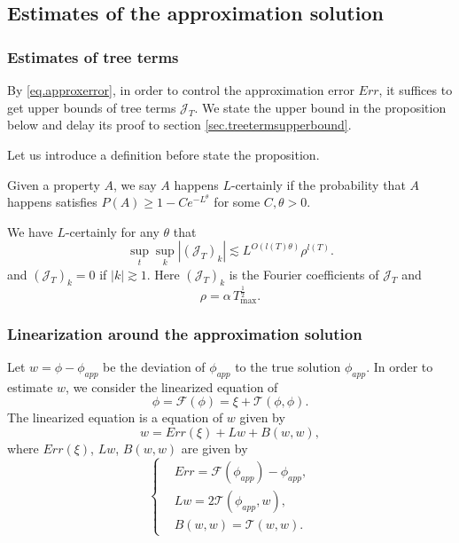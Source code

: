 \subsection{Estimates of the approximation solution}

\subsubsection{Estimates of tree terms} By \eqref{eq.approxerror}, in order to control the approximation error $Err$, it suffices to get upper bounds of tree terms $\mathcal{J}_T$. We state the upper bound in the proposition below and delay its proof to section \ref{sec.treetermsupperbound}.

Let us introduce a definition before state the proposition.

\begin{defn}\label{def.Lcertainly}
Given a property $A$, we say $A$ happens $L$-certainly if the probability that $A$ happens satisfies $P(A)\ge 1-Ce^{-L^\theta}$ for some $C, \theta>0$.
\end{defn}

\begin{prop}\label{prop.treetermsupperbound}
We have $L$-certainly for any $\theta$ that 
\begin{equation}\label{eq.treetermsupperbound}
    \sup_t\sup_k  |(\mathcal{J}_T)_k|\lesssim L^{O(l(T)\theta)} \rho^{l(T)}.
\end{equation}
and $(\mathcal{J}_T)_k=0$ if $|k|\gtrsim 1$. Here $(\mathcal{J}_T)_k$ is the Fourier coefficients of $\mathcal{J}_T$ and \begin{equation}
    \rho=\alpha\, T^{\frac{1}{2}}_{\text{max}}.
\end{equation}
\end{prop}

\subsubsection{Linearization around the approximation solution} Let $w=\phi-\phi_{app}$ be the deviation of $\phi_{app}$ to the true solution $\phi_{app}$. In order to estimate $w$, we consider the linearized equation of
\begin{equation}
    \phi=\mathcal{F}(\phi)=\xi+\mathcal{T}(\phi,\phi).
\end{equation}
The linearized equation is a equation of $w$ given by
\begin{equation}\label{eq.eqw}
    w= Err(\xi)+Lw+B(w,w),
\end{equation}
where $Err(\xi)$, $Lw$, $B(w,w)$ are given by
\begin{equation}
\left\{
\begin{aligned}
    &Err=\mathcal{F}(\phi_{app})-\phi_{app},
    \\
    &Lw=2\mathcal{T}(\phi_{app},w),
    \\
    &B(w,w)=\mathcal{T}(w,w).
\end{aligned}\right.
\end{equation}

